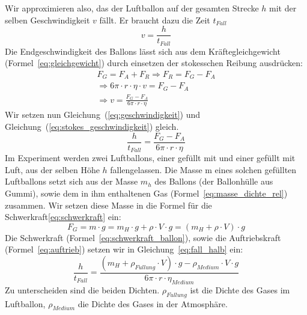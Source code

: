 \documentclass{article}
\begin{document}
    Wir approximieren also, das der Luftballon auf der gesamten Strecke \(h\) mit der selben Geschwindigkeit \(v\) fällt. Er braucht dazu die Zeit \(t_{Fall}\)
    \begin{equation} \label{eq:geschwindigkeit}
        v = \frac{h}{t_{Fall}}
    \end{equation}
    Die Endgeschwindigkeit des Ballons lässt sich aus dem Kräftegleichgewicht (Formel~\ref{eq:gleichgewicht}) durch einsetzen der stokesschen Reibung ausdrücken:
    \begin{equation}
        \begin{gathered} \label{eq:stokes_geschwindigkeit}
            F_G = F_A + F_R \Rightarrow F_R = F_G - F_A \\
            \Rightarrow 6 \pi \cdot r \cdot \eta \cdot v = F_G - F_A \\
            \Rightarrow v = \frac{ F_G - F_A }{ 6 \pi \cdot r \cdot \eta }
        \end{gathered}
    \end{equation}
    Wir setzen nun Gleichung~(\ref{eq:geschwindigkeit}) und Gleichung~(\ref{eq:stokes_geschwindigkeit}) gleich.
    \begin{equation} \label{eq:fall_halb}
        \frac{h}{t_{Fall}} = \frac{ F_G - F_A }{ 6 \pi \cdot r \cdot \eta }
    \end{equation}
    Im Experiment werden zwei Luftballons, einer gefüllt mit  und einer gefüllt mit Luft, aus der selben Höhe \(h\) fallengelassen.
    Die Masse m eines solchen gefüllten Luftballons setzt sich aus der Masse \( m_h \) des Ballons (der Ballonhülle aus Gummi), sowie dem in ihm enthaltenen Gas (Formel~\ref{eq:masse_dichte_rel}) zusammen.
    Wir setzen diese Masse in die Formel für die Schwerkraft\ref{eq:schwerkraft} ein:
    \begin{equation} \label{eq:schwerkraft_ballon}
        F_G = m \cdot g = m_H \cdot g + \rho \cdot V \cdot g = \left( m_H + \rho \cdot V \right) \cdot g
    \end{equation}
    Die Schwerkraft (Formel~\ref{eq:schwerkraft_ballon}), sowie die Auftriebskraft (Formel~\ref{eq:auftrieb}) setzen wir in Gleichung~\ref{eq:fall_halb} ein:
    \begin{equation} \label{eq:fall}
        \frac{h}{t_{Fall}} = \frac{ \left( m_H + \rho_{F\ddot{u}llung} \cdot V \right) \cdot g - \rho_{Medium} \cdot V \cdot g }{ 6 \pi \cdot r \cdot \eta_{Medium} }
    \end{equation}
    Zu unterscheiden sind die beiden Dichten. \(\rho_{F\ddot{u}llung}\) ist die Dichte des Gases im Luftballon, \(\rho_{Medium}\) die Dichte des Gases in der Atmosphäre.
\end{document}

